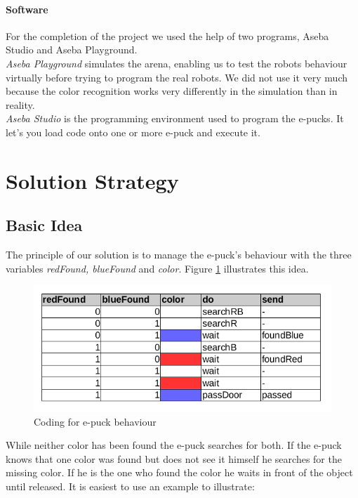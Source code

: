 \documentclass[12pt,a4paper]{article}
\begin{document}
\paragraph{Software}
For the completion of the project we used the help of two programs, Aseba Studio and Aseba Playground.\\
\textit{Aseba Playground} simulates the arena, enabling us to test the robots behaviour virtually before trying to program the real robots. We did not use it very much because the color recognition works very differently in the simulation than in reality.\\
\textit{Aseba Studio} is the programming environment used to program the e-pucks. It let's you load code onto one or more e-puck and execute it.


\section{Solution Strategy} \label{sec:solStrategy}
\subsection{Basic Idea}
The principle of our solution is to manage the e-puck's behaviour with the three variables \textit{redFound, blueFound} and \textit{color}. Figure \ref{fig:behaviour code} illustrates this idea.

\begin{figure}[h!]
\begin{center}
\includegraphics[scale=0.5]{images/behaviourCode.png}
\caption{Coding for e-puck behaviour}
\label{fig:behaviour code}
\end{center}
\end{figure}

\noindent While neither color has been found the e-puck searches for both. If the e-puck knows that one color was found but does not see it himself he searches for the missing color. If he is the one who found the color he waits in front of the object until released. It is easiest to use an example to illustrate:\\
\end{document}

